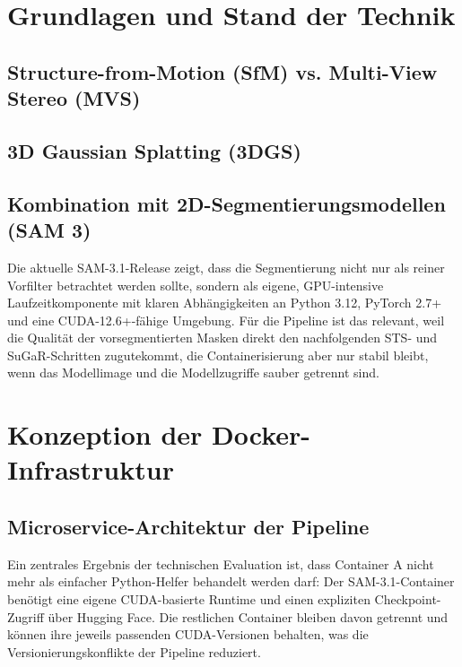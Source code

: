 \documentclass[12pt,twoside=false,a4paper,parskip]{scrbook}
\begin{document}
\chapter{Grundlagen und Stand der Technik} \label{sec:grundlagen}

\section{Structure-from-Motion (SfM) vs. Multi-View Stereo (MVS)}

\section{3D Gaussian Splatting (3DGS)}

\section{Kombination mit 2D-Segmentierungsmodellen (SAM 3)}
Die aktuelle SAM-3.1-Release zeigt, dass die Segmentierung nicht nur als reiner Vorfilter betrachtet werden sollte, sondern als eigene, GPU-intensive Laufzeitkomponente mit klaren Abh\"angigkeiten an Python 3.12, PyTorch 2.7+ und eine CUDA-12.6+-f\"ahige Umgebung. F\"ur die Pipeline ist das relevant, weil die Qualit\"at der vorsegmentierten Masken direkt den nachfolgenden STS- und SuGaR-Schritten zugutekommt, die Containerisierung aber nur stabil bleibt, wenn das Modellimage und die Modellzugriffe sauber getrennt sind.


\chapter{Konzeption der Docker-Infrastruktur} \label{sec:konzeption}

\section{Microservice-Architektur der Pipeline}
Ein zentrales Ergebnis der technischen Evaluation ist, dass Container A nicht mehr als einfacher Python-Helfer behandelt werden darf: Der SAM-3.1-Container ben\"otigt eine eigene CUDA-basierte Runtime und einen expliziten Checkpoint-Zugriff \"uber Hugging Face. Die restlichen Container bleiben davon getrennt und k\"onnen ihre jeweils passenden CUDA-Versionen behalten, was die Versionierungskonflikte der Pipeline reduziert.
\end{document}

